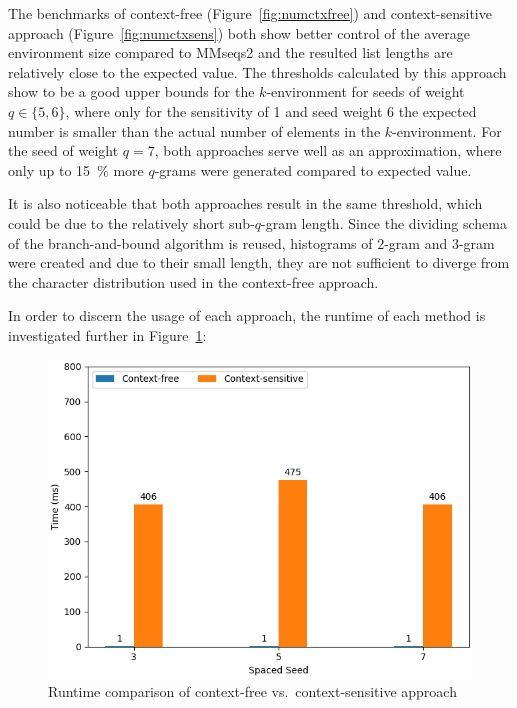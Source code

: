 \documentclass[twoside,a4paper,bsc]{master}
\newcommand{\Qgram}[1]{\(#1\)-gram}
\begin{document}
The benchmarks of context-free (Figure~\ref{fig:numctxfree}) and
context-sensitive approach (Figure~\ref{fig:numctxsens}) both show better
control of the average environment size compared to MMseqs2
and the resulted list lengths are relatively
close to the expected value. The thresholds calculated by this approach show
to be a good upper bounds for the \(k\)-environment for seeds of weight
\(q\in\{5,6\}\), where
only for the sensitivity of 1 and seed weight 6 the expected number is
smaller than the actual number of elements in the \(k\)-environment.
For the seed of weight \(q=7\), both approaches serve well
as an approximation, where only up to 15~\% more \Qgram{q}s were generated
compared to expected value.

It is also noticeable that both approaches result in the same
threshold, which could be due to the relatively short sub-\Qgram{q} length.
Since the dividing schema of the branch-and-bound algorithm is reused,
histograms
of \Qgram{2} and \Qgram{3} were created and due to their small length, they
are
not sufficient to diverge from the character distribution used in the
context-free
approach.

In order to discern the usage of each approach, the runtime
of each method is investigated further in Figure~\ref{fig:sens_runtime}:

\begin{figure}
\centering
\includegraphics[scale=0.6]{graphics/speed_threshold.png}
\caption{Runtime comparison of context-free vs.\ context-sensitive
approach}
\label{fig:sens_runtime}
\end{figure}
\end{document}
